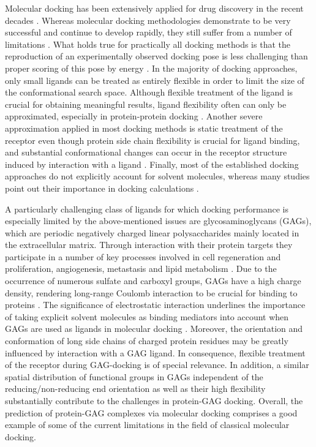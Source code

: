 Molecular docking has been extensively applied for drug
discovery in the recent decades \cite{klebe_recent_2000,
cheng_structure-based_2012}. Whereas molecular docking methodologies demonstrate
to be very successful and continue to develop rapidly, they still suffer from a
number of limitations \cite{moreira_proteinprotein_2010,
andrusier_principles_2008,lensink_docking_2010}. What holds true for practically
all docking methods is that the reproduction of an experimentally observed
docking pose is less challenging than proper scoring of this pose by energy
\cite{kim_assessment_2008, plewczynski_can_2011,smith_csar_2011}. In the
majority of docking approaches, only small ligands can be treated as entirely
flexible in order to limit the size of the conformational search space. Although
flexible treatment of the ligand is crucial for obtaining meaningful results,
ligand flexibility often can only be approximated, especially in protein-protein
docking \cite{ritchie_recent_2008}. Another severe approximation applied in most
docking methods is static treatment of the receptor even though protein side
chain flexibility is crucial for ligand binding, and substantial conformational
changes can occur in the receptor structure induced by interaction with a ligand
\cite{gunasekaran_how_2007,gutteridge_conformational_2005}. Finally, most of the
established docking approaches do not explicitly account for solvent molecules,
whereas many studies point out their importance in docking calculations
\cite{van_dijk_solvated_2006,baron_water_2010,roberts_ligandprotein_2008,
thilagavathi_ligand-protein_2010}.

A particularly challenging class of ligands for which docking
performance is especially limited by the above-mentioned issues are
glycosaminoglycans (GAGs), which are periodic negatively charged linear
polysaccharides mainly located in the extracellular matrix. Through interaction
with their protein targets they participate in a number of key processes
involved in cell regeneration and proliferation, angiogenesis, metastasis and
lipid metabolism \cite{hynes_extracellular_2009, macri_growth_2007,
barbero_chembiochem_2013}. Due to the occurrence of numerous sulfate and
carboxyl groups, GAGs have a high charge density, rendering long-range Coulomb
interaction to be crucial for binding to proteins
\cite{mulloy_specificity_2005}. The significance of electrostatic interaction
underlines the importance of taking explicit solvent molecules as binding
mediators into account when GAGs are used as ligands in molecular docking
\cite{samsonov_docking_2011}. Moreover, the orientation and conformation of long
side chains of charged protein residues may be greatly influenced by interaction
with a GAG ligand. In consequence, flexible treatment of the receptor during
GAG-docking is of special relevance. In addition, a similar spatial distribution
of functional groups in GAGs independent of the reducing/non-reducing end
orientation \cite{hp_binding_sites_mulloy_2006} as well as their high
flexibility \cite{bitomsky_docking_1999} substantially contribute to the
challenges in protein-GAG docking. Overall, the prediction of protein-GAG
complexes via molecular docking comprises a good example of some of the current
limitations in the field of classical molecular docking.

